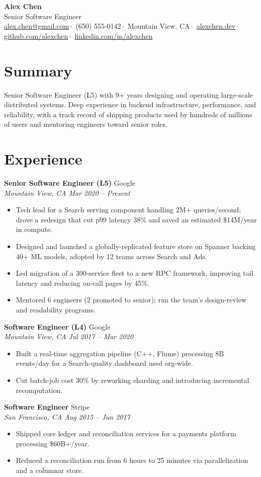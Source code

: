 \documentclass[11pt,letterpaper]{article}
\newcommand{\role}[4]{%
  \textbf{#1} \hfill #2 \\
  \textit{#3} \hfill \textit{#4}%
}
\begin{document}
\begin{center}
  {\Huge \textbf{Alex Chen}}\\[3pt]
  \small
  Senior Software Engineer\\[2pt]
  \href{mailto:alex.chen@gmail.com}{alex.chen@gmail.com}\,$\cdot$\,
  (650) 555-0142\,$\cdot$\,
  Mountain View, CA\,$\cdot$\,
  \href{https://alexchen.dev}{alexchen.dev}\,$\cdot$\,
  \href{https://github.com/alexchen}{github.com/alexchen}\,$\cdot$\,
  \href{https://linkedin.com/in/alexchen}{linkedin.com/in/alexchen}
\end{center}
\vspace{2pt}

\section*{Summary}
Senior Software Engineer (L5) with 9+ years designing and operating large-scale
distributed systems. Deep experience in backend infrastructure, performance, and
reliability, with a track record of shipping products used by hundreds of
millions of users and mentoring engineers toward senior roles.

\section*{Experience}
\role{Senior Software Engineer (L5)}{Google}{Mountain View, CA}{Mar 2020 -- Present}
\begin{itemize}
  \item Tech lead for a Search serving component handling 2M+ queries/second; drove a redesign that cut p99 latency 38\% and saved an estimated \$14M/year in compute.
  \item Designed and launched a globally-replicated feature store on Spanner backing 40+ ML models, adopted by 12 teams across Search and Ads.
  \item Led migration of a 300-service fleet to a new RPC framework, improving tail latency and reducing on-call pages by 45\%.
  \item Mentored 6 engineers (2 promoted to senior); ran the team's design-review and readability programs.
\end{itemize}
\vspace{3pt}
\role{Software Engineer (L4)}{Google}{Mountain View, CA}{Jul 2017 -- Mar 2020}
\begin{itemize}
  \item Built a real-time aggregation pipeline (C++, Flume) processing 8B events/day for a Search-quality dashboard used org-wide.
  \item Cut batch-job cost 30\% by reworking sharding and introducing incremental recomputation.
\end{itemize}
\vspace{3pt}
\role{Software Engineer}{Stripe}{San Francisco, CA}{Aug 2015 -- Jun 2017}
\begin{itemize}
  \item Shipped core ledger and reconciliation services for a payments platform processing \$60B+/year.
  \item Reduced a reconciliation run from 6 hours to 25 minutes via parallelization and a columnar store.
\end{itemize}
\end{document}
